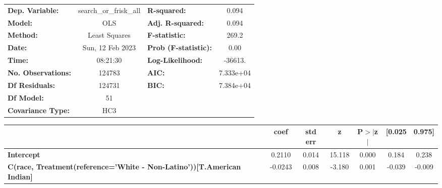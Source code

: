 \begin{center}
\begin{tabular}{lclc}
\toprule
\textbf{Dep. Variable:}                                                           & search\_or\_frisk\_all & \textbf{  R-squared:         } &     0.094   \\
\textbf{Model:}                                                                   &          OLS           & \textbf{  Adj. R-squared:    } &     0.094   \\
\textbf{Method:}                                                                  &     Least Squares      & \textbf{  F-statistic:       } &     269.2   \\
\textbf{Date:}                                                                    &    Sun, 12 Feb 2023    & \textbf{  Prob (F-statistic):} &     0.00    \\
\textbf{Time:}                                                                    &        08:21:30        & \textbf{  Log-Likelihood:    } &   -36613.   \\
\textbf{No. Observations:}                                                        &         124783         & \textbf{  AIC:               } & 7.333e+04   \\
\textbf{Df Residuals:}                                                            &         124731         & \textbf{  BIC:               } & 7.384e+04   \\
\textbf{Df Model:}                                                                &             51         & \textbf{                     } &             \\
\textbf{Covariance Type:}                                                         &          HC3           & \textbf{                     } &             \\
\bottomrule
\end{tabular}
\begin{tabular}{lcccccc}
                                                                                  & \textbf{coef} & \textbf{std err} & \textbf{z} & \textbf{P$> |$z$|$} & \textbf{[0.025} & \textbf{0.975]}  \\
\midrule
\textbf{Intercept}                                                                &       0.2110  &        0.014     &    15.118  &         0.000        &        0.184    &        0.238     \\
\textbf{C(race, Treatment(reference='White - Non-Latino'))[T.American Indian]}    &      -0.0243  &        0.008     &    -3.180  &         0.001        &       -0.039    &       -0.009     \\

\end{tabular}
\end{center}
